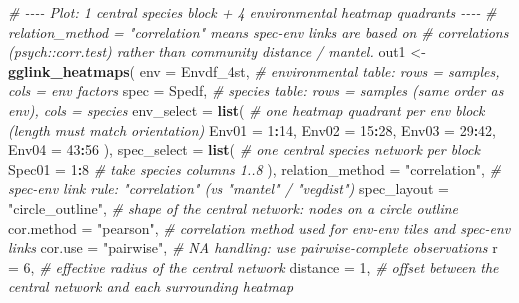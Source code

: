 \documentclass[
]{book}
\newenvironment{Shaded}{\begin{snugshade}}{\end{snugshade}}
\newcommand{\AttributeTok}[1]{\textcolor[rgb]{0.13,0.29,0.53}{#1}}
\newcommand{\CommentTok}[1]{\textcolor[rgb]{0.56,0.35,0.01}{\textit{#1}}}
\newcommand{\DecValTok}[1]{\textcolor[rgb]{0.00,0.00,0.81}{#1}}
\newcommand{\FunctionTok}[1]{\textcolor[rgb]{0.13,0.29,0.53}{\textbf{#1}}}
\newcommand{\NormalTok}[1]{#1}
\newcommand{\OtherTok}[1]{\textcolor[rgb]{0.56,0.35,0.01}{#1}}
\newcommand{\SpecialCharTok}[1]{\textcolor[rgb]{0.81,0.36,0.00}{\textbf{#1}}}
\newcommand{\StringTok}[1]{\textcolor[rgb]{0.31,0.60,0.02}{#1}}
\begin{document}
\begin{Shaded}
\begin{Highlighting}[]
\CommentTok{\# {-}{-}{-}{-} Plot: 1 central species block + 4 environmental heatmap quadrants {-}{-}{-}{-}}
\CommentTok{\# \textasciigrave{}relation\_method = "correlation"\textasciigrave{} means spec{-}env links are based on}
\CommentTok{\# correlations (psych::corr.test) rather than community distance / mantel.}
\NormalTok{out1 }\OtherTok{\textless{}{-}} \FunctionTok{gglink\_heatmaps}\NormalTok{(}
  \AttributeTok{env                =}\NormalTok{ Envdf\_4st,           }\CommentTok{\# environmental table: rows = samples, cols = env factors}
  \AttributeTok{spec               =}\NormalTok{ Spedf,               }\CommentTok{\# species table: rows = samples (same order as env), cols = species}
  \AttributeTok{env\_select         =} \FunctionTok{list}\NormalTok{(                }\CommentTok{\# one heatmap quadrant per env block (length must match \textasciigrave{}orientation\textasciigrave{})}
    \AttributeTok{Env01 =} \DecValTok{1}\SpecialCharTok{:}\DecValTok{14}\NormalTok{,}
    \AttributeTok{Env02 =} \DecValTok{15}\SpecialCharTok{:}\DecValTok{28}\NormalTok{,}
    \AttributeTok{Env03 =} \DecValTok{29}\SpecialCharTok{:}\DecValTok{42}\NormalTok{,}
    \AttributeTok{Env04 =} \DecValTok{43}\SpecialCharTok{:}\DecValTok{56}
\NormalTok{  ),}
  \AttributeTok{spec\_select        =} \FunctionTok{list}\NormalTok{(                }\CommentTok{\# one central species network per block}
    \AttributeTok{Spec01 =} \DecValTok{1}\SpecialCharTok{:}\DecValTok{8}                            \CommentTok{\#   take species columns 1..8}
\NormalTok{  ),}
  \AttributeTok{relation\_method    =} \StringTok{"correlation"}\NormalTok{,       }\CommentTok{\# spec{-}env link rule: "correlation" (vs "mantel" / "vegdist")}
  \AttributeTok{spec\_layout        =} \StringTok{"circle\_outline"}\NormalTok{,    }\CommentTok{\# shape of the central network: nodes on a circle outline}
  \AttributeTok{cor.method         =} \StringTok{"pearson"}\NormalTok{,           }\CommentTok{\# correlation method used for env{-}env tiles and spec{-}env links}
  \AttributeTok{cor.use            =} \StringTok{"pairwise"}\NormalTok{,          }\CommentTok{\# NA handling: use pairwise{-}complete observations}
  \AttributeTok{r                  =} \DecValTok{6}\NormalTok{,                   }\CommentTok{\# effective radius of the central network}
  \AttributeTok{distance           =} \DecValTok{1}\NormalTok{,                   }\CommentTok{\# offset between the central network and each surrounding heatmap}

\end{Highlighting}
\end{Shaded}
\end{document}
